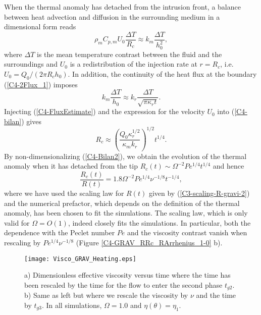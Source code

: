 When  the thermal  anomaly has  detached from  the intrusion  front, a
balance between heat advection and diffusion in the surrounding medium
in a dimensional form reads
\begin{equation}
  \rho_m C_{p,m} U_0 \frac{\Delta T}{R_c} \approx k_m \frac{\Delta T}{h_0^2},
  \label{C4-bilan}
\end{equation}
where $\Delta  T$ is the  mean temperature contrast between  the fluid
and the  surroundings and $U_0$  is a redistribution of  the injection
rate at  $r=R_c$, i.e.   $U_0=Q_0/(2\pi R_c  h_0)$.  In  addition, the
continuity of the heat flux at the boundary (\ref{C4-2Flux_1}) imposes
\begin{equation}
  k_m\frac{\Delta   T}{h_0}\approx   k_r   \frac{\Delta   T}{\sqrt{\pi
      \kappa_r t}}.
  \label{C4-FluxEstimate}
\end{equation}
Injecting (\ref{C4-FluxEstimate}) and the  expression for the velocity
$U_0$ into (\ref{C4-bilan}) gives
\begin{equation}
  R_c \approx  \left(\frac{Q_0\kappa_r^{1/2}}{\kappa_m k_r}\right)^{1/2}
  t^{1/4}.
  \label{C4-Bilan2}
\end{equation}
By non-dimensionalizing (\ref{C4-Bilan2}), we  obtain the evolution of
the   thermal   anomaly   when   it  has   detached   from   the   tip
$R_c(t)\sim \Omega^{-2}Pe^{1/4}t^{1/4}$ and hence
\begin{equation}
  \frac{R_c(t)}{R(t)} = 1.8\Omega^{-2}Pe^{1/4}\nu^{-1/8}t^{-1/4},
  \label{C4-Rc}
\end{equation}
where   we  have   used  the   scaling   law  for   $R(t)$  given   by
(\ref{C3-scaling-R-gravi-2})  and   the  numerical   prefactor,  which
depends on the  definition of the thermal anomaly, has  been chosen to
fit  the  simulations.  The  scaling  law,  which  is only  valid  for
$\Omega = O(1)$,  indeed closely fits the  simulations. In particular,
both  the dependence  with the  Peclet number  $Pe$ and  the viscosity
contrast  vanish  when  rescaling  by  $Pe^{1/4}\nu^{-1/8}$  (Figure
\ref{C4-GRAV_RRc_RArrhenius_1-0} b).

\begin{figure}[h!]
  \begin{center}
    \graphicspath{ {/Users/thorey/Documents/These/Projet/Refroidissement/Skin_Model/Figure/Figure_Heating/} }
    \texttt{[image: Visco\_GRAV\_Heating.eps]}
    \caption{a)  Dimensionless effective  viscosity versus  time where
      the time has been rescaled by the time for the flow to enter the
      second phase $t_{g2}$. b) Same as  left but where we rescale the
      viscosity  by   $\nu$  and  the   time  by  $t_{g3}$.    In  all
      simulations, $\Omega=1.0$ and $\eta(\theta)=\eta_1$.}
    \label{C4-Visco_GRAV_Heating}
  \end{center}
\end{figure}

